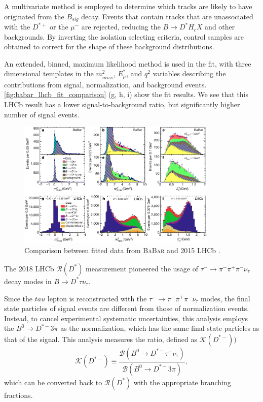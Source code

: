 \documentclass[12pt,letterpaper]{article}
\def\BaBar/{\textsc{BaBar}}
\def\RDst/{\ensuremath{\mathcal{R}(D^{*})}}
\begin{document}
A multivariate method is employed to determine which tracks are likely to have originated from the $B_{sig}$ decay.
Events that contain tracks that are unassociated with the $D^{*+}$ or the $\mu^-$ are rejected, reducing the $B \rightarrow D^* H_c X$ and other backgrounds.
By inverting the isolation selecting criteria, control samples are obtained to correct for the shape of these background distributions.

An extended, binned, maximum likelihood method is used in the fit, with three dimensional templates in the $m^2_{miss}$, $E^*_\mu$, and $q^2$ variables describing the contributions from signal, normalization, and background events.
\autoref{fig:babar_lhcb_fit_comparison} (g, h, i) show the fit results. 
We see that this LHCb result has a lower signal-to-background ratio, but significantly higher number of signal events.

\begin{figure}[ht]
    \centering
    \includegraphics[width=0.85\textwidth]{figs/babar_lhcb_fit_comparison.pdf}
    \caption{
        Comparison between fitted data from \BaBar/ and 2015 LHCb \cite{Ciezarek:2017yzh}.
    }
    \label{fig:babar_lhcb_fit_comparison}
\end{figure}

The 2018 LHCb \RDst/ measurement pioneered the usage of
$\tau^- \rightarrow \pi^- \pi^+ \pi^- \nu_\tau$
decay modes in $B \rightarrow D^{*} \tau \nu_\tau$.

Since the $tau$ lepton is reconstructed with the $\tau^- \rightarrow \pi^- \pi^+ \pi^- \nu_\tau$ modes, the final state particles of signal events are different from those of normalization events.
Instead, to cancel experimental systematic uncertainties, this analysis employs the $B^0 \rightarrow D^{*-} 3\pi$ as the normalization, which has the same final state particles as that of the signal.
This analysis measures the ratio, defined as $\mathcal{K}(D^{*-}))$
\begin{equation}
    \mathcal{K}(D^{*-}) \equiv \frac{
        \mathcal{B}(B^0 \rightarrow D^{*-} \tau^+ \nu_\tau)
    }{
        \mathcal{B}(B^0 \rightarrow D^{*-} 3 \pi)
    },
\end{equation}
which can be converted back to \RDst/ with the appropriate branching fractions.
\end{document}
